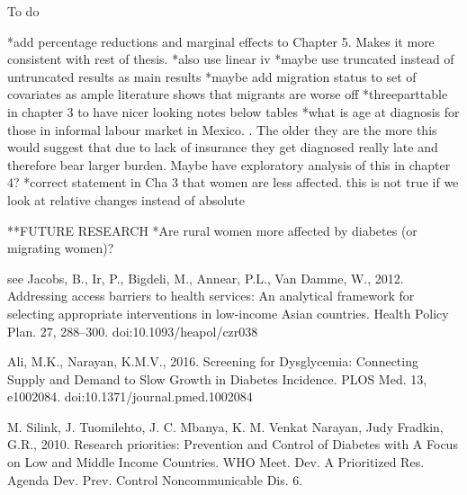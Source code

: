 To do

*add percentage reductions and marginal effects to Chapter 5. Makes it more consistent with rest of thesis.
*also use linear iv
*maybe use truncated instead of untruncated results as main results
*maybe add migration status to set of covariates as ample literature shows that migrants are worse off
*threeparttable in chapter 3 to have nicer looking notes below tables
*what is age at diagnosis for those in informal labour market in Mexico. . The older they are the more this would suggest that due to lack of insurance they get diagnosed really late and therefore bear larger burden. Maybe have exploratory analysis of this in chapter 4?
*correct statement in Cha 3 that women are less affected. this is not true if we look at relative changes instead of absolute


**FUTURE RESEARCH
*Are rural women more affected by diabetes (or migrating women)?




see Jacobs, B., Ir, P., Bigdeli, M., Annear, P.L., Van Damme, W., 2012. Addressing access barriers to health services: An analytical framework for selecting appropriate interventions in low-income Asian countries. Health Policy Plan. 27, 288–300. doi:10.1093/heapol/czr038

Ali, M.K., Narayan, K.M.V., 2016. Screening for Dysglycemia: Connecting Supply and Demand to Slow Growth in Diabetes Incidence. PLOS Med. 13, e1002084. doi:10.1371/journal.pmed.1002084

M. Silink, J. Tuomilehto, J. C. Mbanya, K. M. Venkat Narayan, Judy Fradkin, G.R., 2010. Research priorities: Prevention and Control of Diabetes with A Focus on Low and Middle Income Countries. WHO Meet. Dev. A Prioritized Res. Agenda Dev. Prev. Control Noncommunicable Dis. 6.